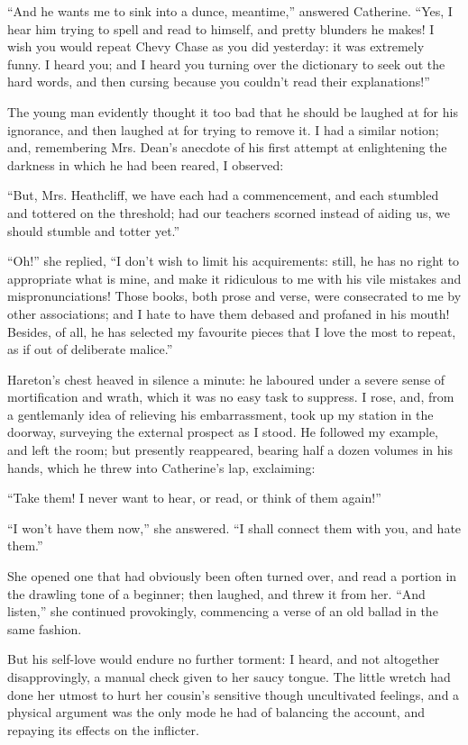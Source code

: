 \par “And he wants me to sink into a dunce, meantime,” answered Catherine. “Yes, I hear him trying to spell and read to himself, and pretty blunders he makes! I wish you would repeat Chevy Chase as you did yesterday: it was extremely funny. I heard you; and I heard you turning over the dictionary to seek out the hard words, and then cursing because you couldn't read their explanations!”
\par The young man evidently thought it too bad that he should be laughed at for his ignorance, and then laughed at for trying to remove it. I had a similar notion; and, remembering Mrs. Dean's anecdote of his first attempt at enlightening the darkness in which he had been reared, I observed:
\par “But, Mrs. Heathcliff, we have each had a commencement, and each stumbled and tottered on the threshold; had our teachers scorned instead of aiding us, we should stumble and totter yet.”
\par “Oh!” she replied, “I don't wish to limit his acquirements: still, he has no right to appropriate what is mine, and make it ridiculous to me with his vile mistakes and mispronunciations! Those books, both prose and verse, were consecrated to me by other associations; and I hate to have them debased and profaned in his mouth! Besides, of all, he has selected my favourite pieces that I love the most to repeat, as if out of deliberate malice.”
\par Hareton's chest heaved in silence a minute: he laboured under a severe sense of mortification and wrath, which it was no easy task to suppress. I rose, and, from a gentlemanly idea of relieving his embarrassment, took up my station in the doorway, surveying the external prospect as I stood. He followed my example, and left the room; but presently reappeared, bearing half a dozen volumes in his hands, which he threw into Catherine's lap, exclaiming:
\par “Take them! I never want to hear, or read, or think of them again!”
\par “I won't have them now,” she answered. “I shall connect them with you, and hate them.”
\par She opened one that had obviously been often turned over, and read a portion in the drawling tone of a beginner; then laughed, and threw it from her. “And listen,” she continued provokingly, commencing a verse of an old ballad in the same fashion.
\par But his self-love would endure no further torment: I heard, and not altogether disapprovingly, a manual check given to her saucy tongue. The little wretch had done her utmost to hurt her cousin's sensitive though uncultivated feelings, and a physical argument was the only mode he had of balancing the account, and repaying its effects on the inflicter.
